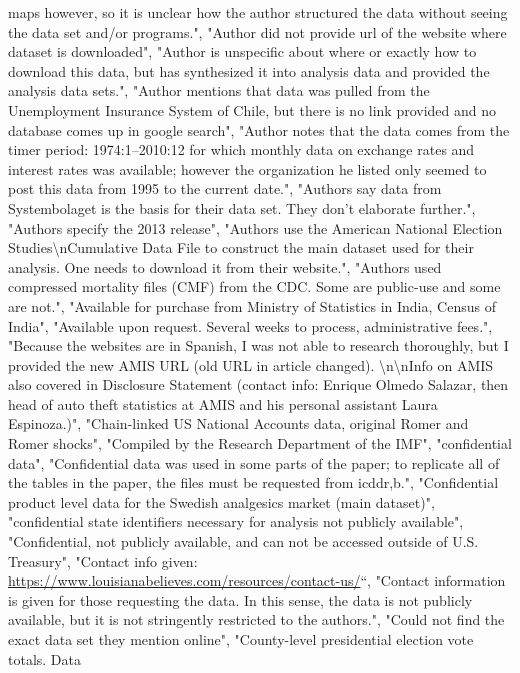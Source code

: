 \documentclass[]{article}
\begin{document}
\begin{itemize}
  maps however, so it is unclear how the author structured the data
  without seeing the data set and/or programs.", "Author did not provide
  url of the website where dataset is downloaded", "Author is unspecific
  about where or exactly how to download this data, but has synthesized
  it into analysis data and provided the analysis data sets.", "Author
  mentions that data was pulled from the Unemployment Insurance System
  of Chile, but there is no link provided and no database comes up in
  google search", "Author notes that the data comes from the timer
  period: 1974:1--2010:12 for which monthly data on exchange rates and
  interest rates was available; however the organization he listed only
  seemed to post this data from 1995 to the current date.", "Authors say
  data from Systembolaget is the basis for their data set. They don't
  elaborate further.", "Authors specify the 2013 release", "Authors use
  the American National Election Studies\textbackslash{}nCumulative Data
  File to construct the main dataset used for their analysis. One needs
  to download it from their website.", "Authors used compressed
  mortality files (CMF) from the CDC. Some are public-use and some are
  not.", "Available for purchase from Ministry of Statistics in India,
  Census of India", "Available upon request. Several weeks to process,
  administrative fees.", "Because the websites are in Spanish, I was not
  able to research thoroughly, but I provided the new AMIS URL (old URL
  in article changed). \textbackslash{}n\textbackslash{}nInfo on AMIS
  also covered in Disclosure Statement (contact info: Enrique Olmedo
  Salazar, then head of auto theft statistics at AMIS and his personal
  assistant Laura Espinoza.)", "Chain-linked US National Accounts data,
  original Romer and Romer shocks", "Compiled by the Research Department
  of the IMF", "confidential data", "Confidential data was used in some
  parts of the paper; to replicate all of the tables in the paper, the
  files must be requested from icddr,b.", "Confidential product level
  data for the Swedish analgesics market (main dataset)", "confidential
  state identifiers necessary for analysis not publicly available",
  "Confidential, not publicly available, and can not be accessed outside
  of U.S. Treasury", "Contact info given:
  \url{https://www.louisianabelieves.com/resources/contact-us/}``,
  "Contact information is given for those requesting the data. In this
  sense, the data is not publicly available, but it is not stringently
  restricted to the authors.", "Could not find the exact data set they
  mention online", "County-level presidential election vote totals. Data

\end{itemize}
\end{document}
